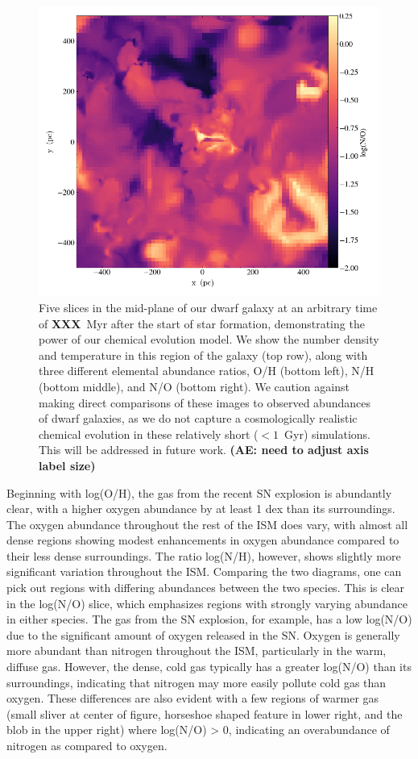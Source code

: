 \documentclass[twocolumn]{aastex61}
\begin{document}
\begin{figure}
\includegraphics[width=0.32\linewidth]{log_NO}
\caption{Five slices in the mid-plane of our dwarf galaxy at an arbitrary time 
  of {\bf XXX}~Myr after the start of star formation,
demonstrating the power of our chemical evolution model. We show the number density and temperature in this region of the galaxy (top row), along with three different elemental abundance ratios, O/H (bottom left), N/H (bottom middle), and N/O (bottom right). We caution against making direct comparisons of these images to observed abundances of dwarf galaxies, as we do not capture a cosmologically realistic chemical evolution in these relatively short ($< 1$~Gyr) simulations. This will be addressed in future work. \textbf{(AE: need to adjust axis label size)}}
\label{fig:metal_slices}
\end{figure}

Beginning with log(O/H), the gas from the recent SN explosion is abundantly clear, with a higher oxygen abundance by at least 1 dex than its surroundings. The oxygen abundance throughout the rest of the ISM does vary, with 
   almost all 
dense regions showing 
   modest enhancements in oxygen abundance compared to their less dense surroundings.
The ratio log(N/H), however, shows slightly more significant variation throughout the ISM. Comparing the two diagrams, one can pick out regions with differing abundances between the two species. This is clear in the log(N/O) slice, which emphasizes regions with strongly varying abundance in either species. The gas from the SN explosion, for example, has a low log(N/O) due to the significant amount of oxygen released in the SN. Oxygen is generally more abundant than nitrogen throughout the ISM, particularly in the warm, diffuse gas. However, the dense, cold gas typically has a greater log(N/O) than its surroundings, indicating that nitrogen may more easily pollute cold gas than oxygen. These differences are also evident with a few regions of warmer gas (small sliver at center of figure, horseshoe shaped feature in lower right, and the blob in the upper right) where log(N/O) > 0, indicating an overabundance of nitrogen as compared to oxygen. 
\end{document}
